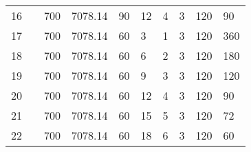 \begin{table}[H]
\begin{tabular}{p{1cm}lp{1cm}p{12mm}p{10mm}p{10mm}p{1cm}lp{1cm}p{1cm}}
    16    &       & 700   & 7078.14 & 90    & 12    & 4     & 3     & 120   & 90 \\
    17    &       & 700   & 7078.14 & 60    & 3     & 1     & 3     & 120   & 360 \\
    18    &       & 700   & 7078.14 & 60    & 6     & 2     & 3     & 120   & 180 \\
    19    &       & 700   & 7078.14 & 60    & 9     & 3     & 3     & 120   & 120 \\
    20    &       & 700   & 7078.14 & 60    & 12    & 4     & 3     & 120   & 90 \\
    21    &       & 700   & 7078.14 & 60    & 15    & 5     & 3     & 120   & 72 \\
    22    &       & 700   & 7078.14 & 60    & 18    & 6     & 3     & 120   & 60 \\
    \bottomrule
    \end{tabular}%
  \label{tab:allExperiments}%
\end{table}%
